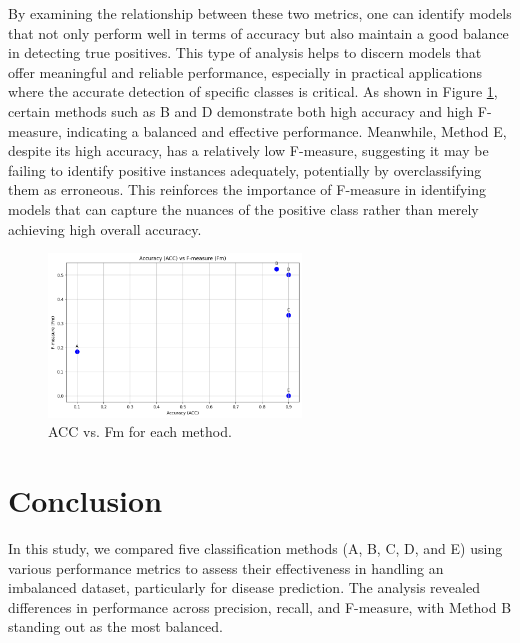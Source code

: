 \documentclass{llncs}
\begin{document}
By examining the relationship between these two metrics, one can identify models that not only perform well in terms of accuracy but also maintain a good balance in detecting true positives. This type of analysis helps to discern models that offer meaningful and reliable performance, especially in practical applications where the accurate detection of specific classes is critical. As shown in Figure \ref{fig
}, certain methods such as B and D demonstrate both high accuracy and high F-measure, indicating a balanced and effective performance. Meanwhile, Method E, despite its high accuracy, has a relatively low F-measure, suggesting it may be failing to identify positive instances adequately, potentially by overclassifying them as erroneous. This reinforces the importance of F-measure in identifying models that can capture the nuances of the positive class rather than merely achieving high overall accuracy.

\begin{figure}[h!] \begin{center} \includegraphics[width=0.6\textwidth]{images/ACC_VS_Fm.png} \caption{ACC vs. Fm for each method.} \label{fig
} \end{center} \end{figure}


\section{Conclusion}
In this study, we compared five classification methods (A, B, C, D, and E) using various performance metrics to assess their effectiveness in handling an imbalanced dataset, particularly for disease prediction. The analysis revealed differences in performance across precision, recall, and F-measure, with Method B standing out as the most balanced.
\end{document}
